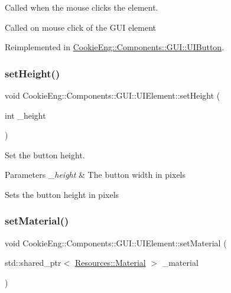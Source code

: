 Called when the mouse clicks the element. 

Called on mouse click of the G\+UI element 

Reimplemented in \hyperlink{class_cookie_eng_1_1_components_1_1_g_u_i_1_1_u_i_button_a236c38fd81450e39f138f06a8b2003b0}{Cookie\+Eng\+::\+Components\+::\+G\+U\+I\+::\+U\+I\+Button}.

\mbox{\label{class_cookie_eng_1_1_components_1_1_g_u_i_1_1_u_i_element_a80afbcb678173b1ebc1c3eb4e2004af2}} 
\subsubsection{\texorpdfstring{set\+Height()}{setHeight()}}
{\footnotesize\ttfamily void Cookie\+Eng\+::\+Components\+::\+G\+U\+I\+::\+U\+I\+Element\+::set\+Height (\begin{DoxyParamCaption}\item[{int}]{\+\_\+height }\end{DoxyParamCaption})}



Set the button height. 


\begin{DoxyParams}{Parameters}
{\em \+\_\+height} & The button width in pixels\\
\hline
\end{DoxyParams}
Sets the button height in pixels \mbox{\label{class_cookie_eng_1_1_components_1_1_g_u_i_1_1_u_i_element_abcac765bc6a76f435ef4a45d2a717097}} 
\subsubsection{\texorpdfstring{set\+Material()}{setMaterial()}}
{\footnotesize\ttfamily void Cookie\+Eng\+::\+Components\+::\+G\+U\+I\+::\+U\+I\+Element\+::set\+Material (\begin{DoxyParamCaption}\item[{std\+::shared\+\_\+ptr$<$ \hyperlink{class_cookie_eng_1_1_resources_1_1_material}{Resources\+::\+Material} $>$}]{\+\_\+material }\end{DoxyParamCaption})\hspace{0.3cm}{\ttfamily [inline]}}



